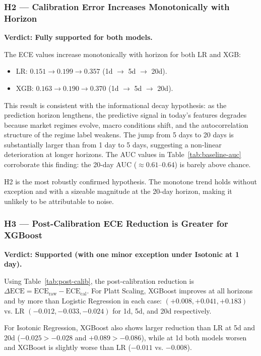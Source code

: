 \documentclass[12pt]{article}
\begin{document}
\subsubsection{H2 --- Calibration Error Increases Monotonically with Horizon}

\textbf{Verdict: Fully supported for both models.}

The ECE values increase monotonically with horizon for both LR and XGB:
\begin{itemize}[leftmargin=1.5em,itemsep=2pt,topsep=4pt]
  \item LR: $0.151 \to 0.199 \to 0.357$ (1d $\to$ 5d $\to$ 20d). \checkmark
  \item XGB: $0.163 \to 0.190 \to 0.370$ (1d $\to$ 5d $\to$ 20d). \checkmark
\end{itemize}

This result is consistent with the informational decay hypothesis: as the prediction
horizon lengthens, the predictive signal in today's features degrades because market
regimes evolve, macro conditions shift, and the autocorrelation structure of the
regime label weakens.
The jump from 5 days to 20 days is substantially larger than from 1 day to 5 days,
suggesting a non-linear deterioration at longer horizons.
The AUC values in Table~\ref{tab:baseline-auc} corroborate this finding:
the 20-day AUC ($\approx 0.61$--$0.64$) is barely above chance.

H2 is the most robustly confirmed hypothesis.
The monotone trend holds without exception and with a sizeable magnitude at the
20-day horizon, making it unlikely to be attributable to noise.

\subsubsection{H3 --- Post-Calibration ECE Reduction is Greater for XGBoost}

\textbf{Verdict: Supported (with one minor exception under Isotonic at 1 day).}

Using Table~\ref{tab:post-calib}, the post-calibration reduction is
$\Delta\text{ECE}=\text{ECE}_{\text{raw}}-\text{ECE}_{\text{cal}}$.
For Platt Scaling, XGBoost improves at all horizons and by more than Logistic
Regression in each case:
$(+0.008, +0.041, +0.183)$ vs. LR $(-0.012, -0.033, -0.024)$
for 1d, 5d, and 20d respectively.

For Isotonic Regression, XGBoost also shows larger reduction than LR at 5d and 20d
($-0.025 > -0.028$ and $+0.089 > -0.086$), while at 1d both models worsen and
XGBoost is slightly worse than LR ($-0.011$ vs. $-0.008$).
\end{document}
